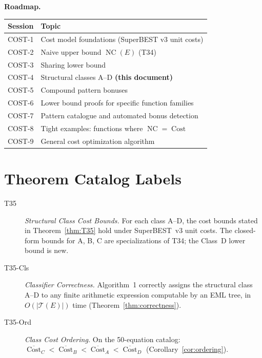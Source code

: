 \documentclass[12pt,a4paper]{article}
\theoremstyle{definition}
\newcommand{\NC}{\operatorname{NC}}
\newcommand{\Cost}{\operatorname{Cost}}
\begin{document}
\medskip
\noindent\textbf{Roadmap.}
\begin{center}
\begin{tabular}{@{}ll@{}}
\toprule
\textbf{Session} & \textbf{Topic} \\
\midrule
COST-1 & Cost model foundations (SuperBEST v3 unit costs) \\
COST-2 & Naive upper bound $\NC(E)$ (T34) \\
COST-3 & Sharing lower bound \\
COST-4 & Structural classes A--D \textbf{(this document)} \\
COST-5 & Compound pattern bonuses \\
COST-6 & Lower bound proofs for specific function families \\
COST-7 & Pattern catalogue and automated bonus detection \\
COST-8 & Tight examples: functions where $\NC = \Cost$ \\
COST-9 & General cost optimization algorithm \\
\bottomrule
\end{tabular}
\end{center}

\section*{Theorem Catalog Labels}

\begin{description}
  \item[T35] \emph{Structural Class Cost Bounds.}
        For each class A--D, the cost bounds stated in
        Theorem~\ref{thm:T35} hold under SuperBEST~v3 unit costs.
        The closed-form bounds for A, B, C are specializations of T34;
        the Class~D lower bound is new.

  \item[T35-Cls] \emph{Classifier Correctness.}
        Algorithm~1 correctly assigns the structural class A--D to any
        finite arithmetic expression computable by an EML tree, in
        $O(|\mathcal{T}(E)|)$ time (Theorem~\ref{thm:correctness}).

  \item[T35-Ord] \emph{Class Cost Ordering.}
        On the 50-equation catalog:
        $\overline{\Cost}_C < \overline{\Cost}_B < \overline{\Cost}_A < \overline{\Cost}_D$
        (Corollary~\ref{cor:ordering}).
\end{description}
\end{document}
